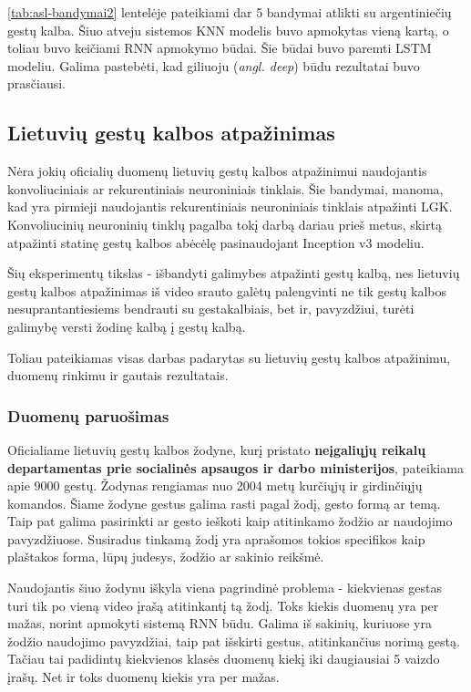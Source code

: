 \documentclass{VUMIFPSbakalaurinis}
\begin{document}
\ref{tab:asl-bandymai2} lentelėje pateikiami dar 5 bandymai atlikti su argentiniečių gestų kalba. Šiuo atveju sistemos KNN modelis buvo apmokytas vieną kartą, o toliau buvo keičiami RNN apmokymo būdai. Šie būdai buvo paremti LSTM modeliu. Galima pastebėti, kad giliuoju (\textit{angl. deep}) būdu rezultatai buvo prasčiausi. 

\subsection{Lietuvių gestų kalbos atpažinimas}

Nėra jokių oficialių duomenų lietuvių gestų kalbos atpažinimui naudojantis konvoliuciniais ar rekurentiniais neuroniniais tinklais. Šie bandymai, manoma, kad yra pirmieji naudojantis rekurentiniais neuroniniais tinklais atpažinti LGK. Konvoliucinių neuroninių tinklų pagalba tokį darbą dariau prieš metus, skirtą atpažinti statinę gestų kalbos abėcėlę pasinaudojant Inception v3 modeliu.

Šių eksperimentų tikslas - išbandyti galimybes atpažinti gestų kalbą, nes lietuvių gestų kalbos atpažinimas iš video srauto galėtų palengvinti ne tik gestų kalbos nesuprantantiesiems bendrauti su gestakalbiais, bet ir, pavyzdžiui, turėti galimybę versti žodinę kalbą į gestų kalbą. 

Toliau pateikiamas visas darbas padarytas su lietuvių gestų kalbos atpažinimu, duomenų rinkimu ir gautais rezultatais.

\subsubsection{Duomenų paruošimas}
Oficialiame lietuvių gestų kalbos žodyne, kurį pristato \textbf{neįgaliųjų reikalų departamentas prie socialinės apsaugos ir darbo ministerijos}, pateikiama apie 9000 gestų. Žodynas rengiamas nuo 2004 metų kurčiųjų ir girdinčiųjų komandos. Šiame žodyne gestus galima rasti pagal žodį, gesto formą ar temą. Taip pat galima pasirinkti ar gesto ieškoti kaip atitinkamo žodžio ar naudojimo pavyzdžiuose. Susiradus tinkamą žodį yra aprašomos tokios specifikos kaip plaštakos forma, lūpų judesys, žodžio ar sakinio reikšmė. 

Naudojantis šiuo žodynu iškyla viena pagrindinė problema - kiekvienas gestas turi tik po vieną video įrašą atitinkantį tą žodį. Toks kiekis duomenų yra per mažas, norint apmokyti sistemą RNN būdu. Galima iš sakinių, kuriuose yra žodžio naudojimo pavyzdžiai, taip pat išskirti gestus, atitinkančius norimą gestą. Tačiau tai padidintų kiekvienos klasės duomenų kiekį iki daugiausiai 5 vaizdo įrašų. Net ir toks duomenų kiekis yra per mažas.
\end{document}
